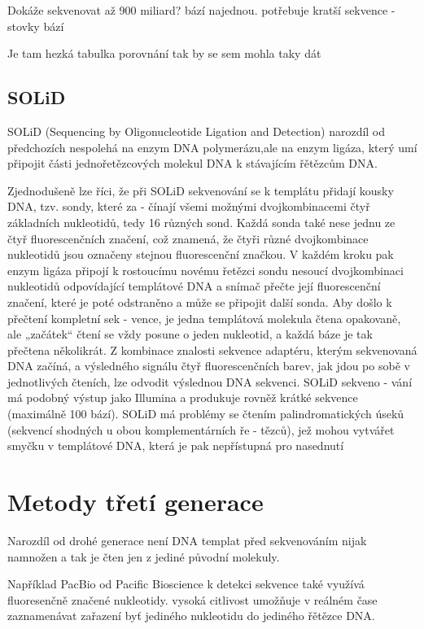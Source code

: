 \documentclass[czech,DP]{thesiskiv}
\begin{document}
Dokáže sekvenovat až 900 miliard? bází najednou. 
potřebuje kratší sekvence - stovky bází



Je tam hezká tabulka porovnání tak by se sem mohla taky dát

\subsection{SOLiD}
SOLiD (Sequencing by Oligonucleotide Ligation and Detection)
narozdíl od předchozích nespolehá na enzym DNA polymerázu,ale na enzym ligáza, který umí připojit části jednořetězcových molekul DNA k stávajícím řětězcům DNA.

 Zjednodušeně lze říci,
že při SOLiD sekvenování se k templátu
přidají kousky DNA, tzv. sondy, které za -
čínají všemi možnými dvojkombinacemi
čtyř základních nukleotidů, tedy 16 různých sond. Každá sonda také nese jednu ze
čtyř fluorescenčních značení, což znamená, že čtyři různé dvojkombinace nukleotidů jsou označeny stejnou fluorescenční
značkou. V každém kroku pak enzym ligáza připojí k rostoucímu novému řetězci
sondu nesoucí dvojkombinaci nukleotidů odpovídající templátové DNA a snímač
přečte její fluorescenční značení, které je
poté odstraněno a může se připojit další
sonda. Aby došlo k přečtení kompletní sek -
vence, je jedna templátová molekula čtena
opakovaně, ale „začátek“ čtení se vždy
posune o jeden nukleotid, a každá báze je
tak přečtena několikrát. Z kombinace znalosti sekvence adaptéru, kterým sekvenovaná DNA začíná, a výsledného signálu
čtyř fluorescenčních barev, jak jdou po
sobě v jednotlivých čteních, lze odvodit
výslednou DNA sekvenci. SOLiD sekveno -
vání má podobný výstup jako Illumina
a produkuje rovněž krátké sekvence (maximálně 100 bází). SOLiD má problémy se
čtením palindromatických úseků (sekvencí shodných u obou komplementárních ře -
tězců), jež mohou vytvářet smyčku v templátové DNA, která je pak nepřístupná pro
nasednutí 

\section{Metody třetí generace}
Narozdíl od drohé generace není DNA templat před sekvenováním nijak namnožen a tak je čten jen z jediné původní molekuly.

Například PacBio od Pacific Bioscience
k detekci sekvence také využívá fluoresenčně značené nukleotidy. 
vysoká citlivost umožňuje v reálném čase zaznamenávat zařazení byť jediného nukleotidu do jediného řětězce DNA.
\end{document}
